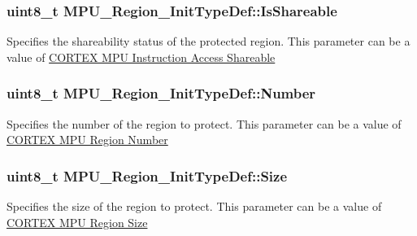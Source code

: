 \subsubsection[{\texorpdfstring{Is\+Shareable}{IsShareable}}]{\setlength{\rightskip}{0pt plus 5cm}uint8\+\_\+t M\+P\+U\+\_\+\+Region\+\_\+\+Init\+Type\+Def\+::\+Is\+Shareable}\hypertarget{struct_m_p_u___region___init_type_def_a8dbc521b7c1b8e49f7657718292e2e32}{}\label{struct_m_p_u___region___init_type_def_a8dbc521b7c1b8e49f7657718292e2e32}
Specifies the shareability status of the protected region. This parameter can be a value of \hyperlink{group___c_o_r_t_e_x___m_p_u___access___shareable}{C\+O\+R\+T\+EX M\+PU Instruction Access Shareable} 
\subsubsection[{\texorpdfstring{Number}{Number}}]{\setlength{\rightskip}{0pt plus 5cm}uint8\+\_\+t M\+P\+U\+\_\+\+Region\+\_\+\+Init\+Type\+Def\+::\+Number}\hypertarget{struct_m_p_u___region___init_type_def_ac4f3fbb3f77290e8e6db13d420ba4ed6}{}\label{struct_m_p_u___region___init_type_def_ac4f3fbb3f77290e8e6db13d420ba4ed6}
Specifies the number of the region to protect. This parameter can be a value of \hyperlink{group___c_o_r_t_e_x___m_p_u___region___number}{C\+O\+R\+T\+EX M\+PU Region Number} 
\subsubsection[{\texorpdfstring{Size}{Size}}]{\setlength{\rightskip}{0pt plus 5cm}uint8\+\_\+t M\+P\+U\+\_\+\+Region\+\_\+\+Init\+Type\+Def\+::\+Size}\hypertarget{struct_m_p_u___region___init_type_def_ad043bd85298d271490c41b4806766ac7}{}\label{struct_m_p_u___region___init_type_def_ad043bd85298d271490c41b4806766ac7}
Specifies the size of the region to protect. This parameter can be a value of \hyperlink{group___c_o_r_t_e_x___m_p_u___region___size}{C\+O\+R\+T\+EX M\+PU Region Size} 
